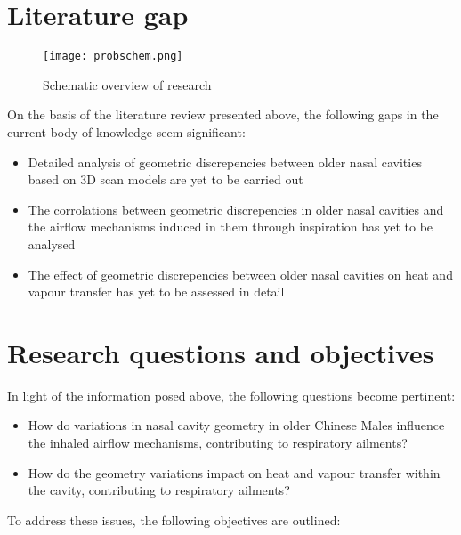 \section{Literature gap}

\begin{figure}
  \centering
  \texttt{[image: probschem.png]}
  \caption{Schematic overview of research}\label{fig:prbschm}
\centering
\end{figure}

On the basis of the literature review presented above, the following gaps in the current body of knowledge seem significant:

\begin{itemize}

  \item Detailed analysis of geometric discrepencies between older nasal cavities based on 3D scan models are yet to be carried out

  \item The corrolations between geometric discrepencies in older nasal cavities and the airflow mechanisms induced in them through inspiration has yet to be analysed

  \item The effect of geometric discrepencies between older nasal cavities on heat and vapour transfer has yet to be assessed in detail

\end{itemize}
\section{Research questions and objectives}

In light of the information posed above, the following questions become pertinent:

\begin{itemize}

  \item How do variations in nasal cavity geometry in older Chinese Males influence the inhaled airflow mechanisms, contributing to respiratory ailments?

  \item How do the geometry variations impact on heat and vapour transfer within the cavity, contributing to respiratory ailments?

\end{itemize}

To address these issues, the following objectives are outlined:

